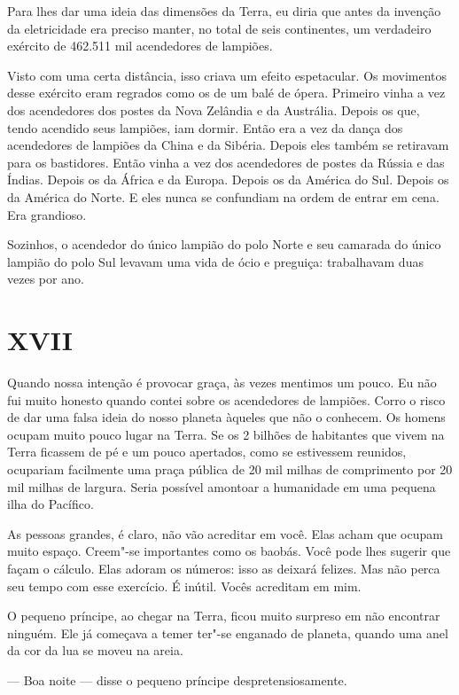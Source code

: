 \begin{Parallel}[p]{}{}
{Para lhes dar uma ideia das dimensões da Terra, eu diria que antes da
invenção da eletricidade era preciso manter, no total de seis
continentes, um verdadeiro exército de 462.511 mil acendedores de
lampiões.

Visto com uma certa distância, isso criava um efeito espetacular. Os
movimentos desse exército eram regrados como os de um balé de ópera.
Primeiro vinha a vez dos acendedores dos postes da Nova Zelândia e da
Austrália. Depois os que, tendo acendido seus lampiões, iam dormir.
Então era a vez da dança dos acendedores de lampiões da China e da
Sibéria. Depois eles também se retiravam para os bastidores. Então vinha
a vez dos acendedores de postes da Rússia e das Índias. Depois os da
África e da Europa. Depois os da América do Sul. Depois os da América do
Norte. E eles nunca se confundiam na ordem de entrar em cena. Era
grandioso.

Sozinhos, o acendedor do único lampião do polo Norte e seu camarada do
único lampião do polo Sul levavam uma vida de ócio e preguiça:
trabalhavam duas vezes por ano.

\section{XVII}

Quando nossa intenção é provocar graça, às vezes mentimos um pouco. Eu
não fui muito honesto quando contei sobre os acendedores de lampiões.
Corro o risco de dar uma falsa ideia do nosso planeta àqueles que não o
conhecem. Os homens ocupam muito pouco lugar na Terra. Se os 2 bilhões
de habitantes que vivem na Terra ficassem de pé e um pouco apertados,
como se estivessem reunidos, ocupariam facilmente uma praça pública de
20 mil milhas de comprimento por 20 mil milhas de largura. Seria
possível amontoar a humanidade em uma pequena ilha do Pacífico.

As pessoas grandes, é claro, não vão acreditar em você. Elas acham que
ocupam muito espaço. Creem"-se importantes como os baobás. Você pode lhes
sugerir que façam o cálculo. Elas adoram os números: isso as deixará
felizes. Mas não perca seu tempo com esse exercício. É inútil. Vocês
acreditam em mim.

O pequeno príncipe, ao chegar na Terra, ficou muito surpreso em não
encontrar ninguém. Ele já começava a temer ter"-se enganado de planeta,
quando uma anel da cor da lua se moveu na areia.

--- Boa noite --- disse o pequeno príncipe despretensiosamente.

}
\end{Parallel}
